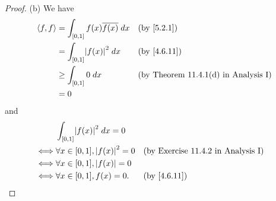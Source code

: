 \begin{proof}{(b)}
  We have
  \begin{align*}
    \inner*{f, f} & = \int_{[0, 1]} f(x) \overline{f(x)} \; dx &  & \by{5.2.1}                                  \\
                  & = \int_{[0, 1]} \abs{f(x)}^2 \; dx         &  & \by{4.6.11}                                 \\
                  & \geq \int_{[0, 1]} 0 \; dx                 &  & \text{(by Theorem 11.4.1(d) in Analysis I)} \\
                  & = 0
  \end{align*}
  and
  \begin{align*}
         & \int_{[0, 1]} \abs{f(x)}^2 \; dx = 0                                                  \\
    \iff & \forall x \in [0, 1], \abs{f(x)}^2 = 0 &  & \text{(by Exercise 11.4.2 in Analysis I)} \\
    \iff & \forall x \in [0, 1], \abs{f(x)} = 0                                                  \\
    \iff & \forall x \in [0, 1], f(x) = 0.        &  & \by{4.6.11}
  \end{align*}
\end{proof}


